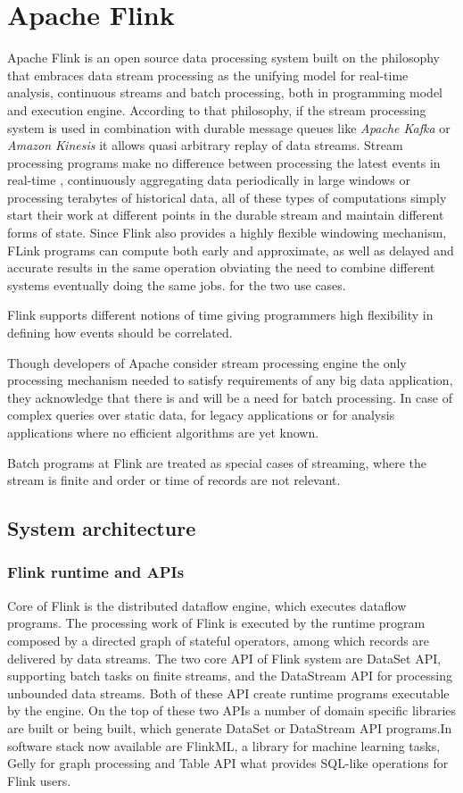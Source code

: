 \section{Apache Flink}\label{flink}
Apache Flink is an open source data processing system built on the philosophy that embraces  data stream processing as the unifying model for real-time analysis, continuous streams and batch processing, both in  programming model and execution engine. 
According to that philosophy, if the stream processing system is used in combination with durable message queues like \textit{Apache Kafka} or \textit{Amazon Kinesis}  
it allows quasi arbitrary replay of data streams. Stream processing programs make no difference between processing the latest events in real-time , 
continuously aggregating data periodically in large windows or processing terabytes of historical data, all of these types of computations  simply start their work at 
different points in the durable stream and maintain different forms of state. Since Flink also provides a highly flexible windowing mechanism, 
FLink programs can compute both early and approximate, as well as delayed and accurate results in the same operation obviating the need to combine different systems eventually doing the same jobs. 
for the two use cases.

Flink supports different notions of time giving programmers high flexibility in defining how events should be correlated.

Though developers of Apache consider stream processing engine the only processing mechanism needed to satisfy requirements of any big data application, they acknowledge that there is and will be a need for batch processing. In case of complex queries over static data, for legacy applications or for analysis applications where no efficient  algorithms  are yet known.

Batch programs at Flink are treated as special cases of streaming, where the stream is finite and order or time of records are not relevant.
\subsection{System architecture} 
\subsubsection{Flink runtime and APIs}
Core of Flink is the distributed dataflow engine, which executes dataflow programs. The processing work of Flink is executed by the runtime program composed by a directed graph of stateful operators, among which records are delivered by data streams. The two core API of Flink system are DataSet API, supporting batch tasks on finite streams, and the DataStream API  for processing unbounded data streams. Both of these API create runtime programs executable by the engine.
On the top of these two APIs a number of domain specific libraries are built or being built, which generate DataSet or DataStream  API programs.In software stack now available are FlinkML, a library for machine learning tasks, Gelly for graph processing and Table API what provides SQL-like operations for Flink users.

